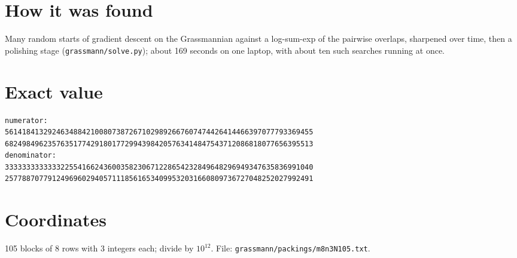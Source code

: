 \documentclass[11pt,a4paper]{article}
\begin{document}
\section{How it was found}
Many random starts of gradient descent on the Grassmannian against a log-sum-exp of the pairwise overlaps, sharpened over time, then a polishing stage (\texttt{grassmann/solve.py}); about 169 seconds on one laptop, with about ten such searches running at once.


\appendix
\section{Exact value}
{\small
\begin{verbatim}
numerator:
561418413292463488421008073872671029892667607474426414466397077793369455
682498496235763517742918017729943984205763414847543712086818077656395513
denominator:
333333333333322554166243600358230671228654232849648296949347635836991040
257788707791249696029405711185616534099532031660809736727048252027992491
\end{verbatim}}

\section{Coordinates}
105 blocks of 8 rows with 3 integers each; divide by $10^{12}$. File: \texttt{grassmann/packings/m8n3N105.txt}.
{\tiny
\begin{multicols}{3}
\end{multicols}}
\end{document}

